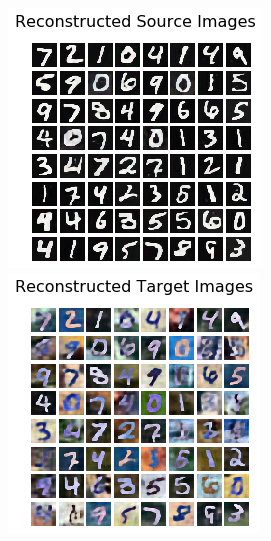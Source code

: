 \documentclass{article}
\begin{document}
\begin{figure}
\begin{minipage}[t]{0.5\textwidth}
\begin{minipage}[t]{0.48\textwidth}
    \end{minipage}
    \vspace{2mm}
    \begin{minipage}[t]{0.48\textwidth}
      \includegraphics[width=\linewidth]{DSN/reconstructed_source.png}
    \end{minipage}
    \hfill
    \begin{minipage}[t]{0.48\textwidth}
      \includegraphics[width=\linewidth]{DSN/reconstructed_target.png}
    \end{minipage}

  \end{minipage}
\end{figure}
\end{document}
